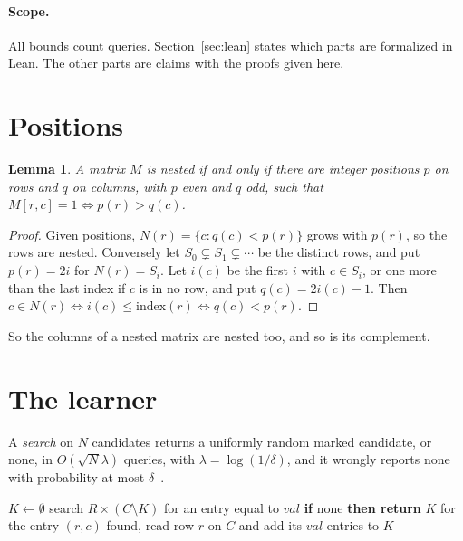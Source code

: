 \documentclass[11pt]{article}
\newtheorem{lemma}[theorem]{Lemma}
\theoremstyle{remark}
\newcommand{\AlgHold}{\textup{\textsc{Holding}}}
\begin{document}
\paragraph{Scope.} All bounds count queries. Section~\ref{sec:lean} states which parts are formalized in Lean. The other parts are claims with the proofs given here.

\section{Positions}

\begin{lemma}\label{lem:positions}
A matrix $M$ is nested if and only if there are integer positions $p$ on rows and $q$ on columns, with $p$ even and $q$ odd, such that $M[r,c]=1\iff p(r)>q(c)$.
\end{lemma}
\begin{proof}
Given positions, $N(r)=\{c:q(c)<p(r)\}$ grows with $p(r)$, so the rows are nested. Conversely let $S_0\subsetneq S_1\subsetneq\cdots$ be the distinct rows, and put $p(r)=2i$ for $N(r)=S_i$. Let $i(c)$ be the first $i$ with $c\in S_i$, or one more than the last index if $c$ is in no row, and put $q(c)=2i(c)-1$. Then $c\in N(r)\iff i(c)\le\mathrm{index}(r)\iff q(c)<p(r)$.
\end{proof}

So the columns of a nested matrix are nested too, and so is its complement.

\section{The learner}

A \emph{search} on $N$ candidates returns a uniformly random marked candidate, or none, in $O(\sqrt N\lambda)$ queries, with $\lambda=\log(1/\delta)$, and it wrongly reports none with probability at most $\delta$~\cite{BBHT98}.

\begin{algorithm}[h]
\caption{\AlgHold$(R,C,\mathit{val})$}
\begin{algorithmic}[1]
\State $K\gets\emptyset$
\Loop
  \State search $R\times(C\setminus K)$ for an entry equal to $\mathit{val}$
  \State \textbf{if} none \textbf{then return} $K$
  \State for the entry $(r,c)$ found, read row $r$ on $C$ and add its $\mathit{val}$-entries to $K$
\EndLoop
\end{algorithmic}
\end{algorithm}
\end{document}
